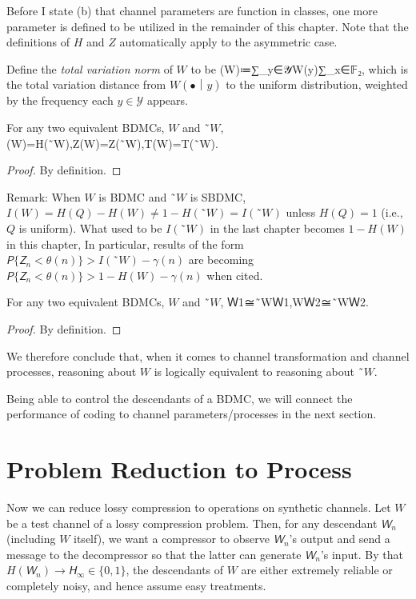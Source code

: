 \documentclass[openany]{amsbook}
\numberwithin{equation}{chapter}
\numberwithin{figure}{chapter}
\numberwithin{table}{chapter}
\DeclarePairedDelimiter\abs\lvert\rvert
\def\[#1\]{\begin{equation*}{#1}\end{equation*}}
\theoremstyle{definition}	理dfn:Definition~?s			理exa:Example~?s
\theoremstyle{remark}		理cla:Claim~?s				理rem:Remark~?s
\begin{document}
	Before I state (b) that channel parameters are function in classes,
	one more parameter is defined to be utilized in the remainder of this chapter.
	Note that the definitions of $H$ and $Z$ automatically apply to the asymmetric case.
	
	\begin{dfn}\label{dfn:bin-T}
		Define the \emph{total variation norm} of $W$ to be
		\[T(W)≔∑_{y∈𝒴}W(y)∑_{x∈𝔽₂}\abs[\Big]{W(x｜y)-÷12},\]
		which is the total variation distance from $W(•｜y)$ to
		the uniform distribution, weighted by the frequency each $y∈𝒴$ appears.
	\end{dfn}
	
	\begin{lem}
		For any two equivalent BDMCs, $W$ and $˜W$,
		\[H(W)=H(˜W),\quad Z(W)=Z(˜W),\quad T(W)=T(˜W).\]
	\end{lem}
	
	\begin{proof}
		By definition.
	\end{proof}
	
	Remark:
	When $W$ is BDMC and $˜W$ is SBDMC, $I(W)=H(Q)-H(W)≠1-H(˜W)=I(˜W)$
	unless $H(Q)=1$ (i.e., $Q$ is uniform).
	What used to be $I(˜W)$ in the last chapter becomes $1-H(W)$ in this chapter,
	In particular, results of the form $𝘗\{𝘡_n<θ(n)\}>I(˜W)-γ(n)$
	are becoming $𝘗\{𝘡_n<θ(n)\}>1-H(W)-γ(n)$ when cited.
	
	\begin{lem}
		For any two equivalent BDMCs, $W$ and $˜W$,
		\[WＷ1≅˜WＷ1,\qquad WＷ2≅˜WＷ2.\]
	\end{lem}
	
	\begin{proof}
		By definition.
	\end{proof}
	
	We therefore conclude that, when it comes to channel transformation and channel
	processes, reasoning about $W$ is logically equivalent to reasoning about $˜W$.
	
	Being able to control the descendants of a BDMC, we will connect
	the performance of coding to channel parameters/processes in the next section.

\section{Problem Reduction to Process}

	Now we can reduce lossy compression to operations on synthetic channels.
	Let $W$ be a test channel of a lossy compression problem.
	Then, for any descendant $𝘞_n$ (including $W$ itself),
	we want a compressor to observe $𝘞_n$'s output and send a message
	to the decompressor so that the latter can generate $𝘞_n$'s input.
	By that $H(𝘞_n)→𝘏_∞∈\{0,1\}$, the descendants of $W$ are either
	extremely reliable or completely noisy, and hence assume easy treatments.
	
\end{document}
